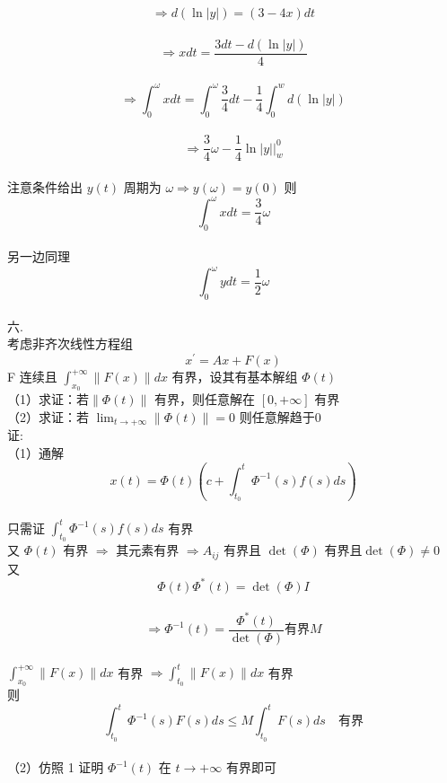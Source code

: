\documentclass[UTF8]{ctexart}
\begin{document}
$$\Rightarrow d(\ln |y|)=(3-4 x) d t$$\\
$$\Rightarrow x d t=\frac{3 d t-d(\ln |y|)}{4}$$\\
$$\Rightarrow \int_{0}^{\omega} x d t=\int_{0}^{\omega} \frac{3}{4} d t-\frac{1}{4} \int_{0}^{w} d(\ln |y|)$$\\
$$\Rightarrow \frac{3}{4} \omega - \frac{1}{4} \ln |y| \Big|_{w}^{0}$$\\
注意条件给出 $y(t)$ 周期为 $\omega \Rightarrow y(\omega)=y(0)$ 则 $$\int_{0}^{\omega} x d t=\frac{3}{4} \omega$$\\
另一边同理 $$\int_{0}^{\omega} y d t=\frac{1}{2} \omega$$\\
六.\\
考虑非齐次线性方程组
$$
x^{\prime}=A x+F(x)
$$
F 连续且 $\int_{x_{0}}^{+\infty}\|F(x)\| d x$ 有界，设其有基本解组 $\Phi(t)$\\
（1）求证：若$\|\Phi(t) \|$ 有界，则任意解在 $[0,+\infty]$ 有界\\
（2）求证：若 $\lim _{t \rightarrow+\infty}\|\Phi(t)\|=0$ 则任意解趋于$0$\\
证:\\（1）通解 $$x(t)=\Phi(t)\left(c+\int_{t_{0}}^{t} \Phi^{-1}(s) f(s) d s\right)$$\\
只需证 $\int_{t_{0}}^{t} \Phi^{-1}(s) f(s) d s$ 有界\\
又 $\Phi(t)$ 有界 $\Rightarrow$ 其元素有界 $\Rightarrow A_{i j}$ 有界且 $\operatorname{det}(\Phi)$ 有界且$\operatorname{det}(\Phi) \neq 0$\\
又 $$\Phi(t) \Phi^{*}(t)=\operatorname{det}(\Phi) I$$\\
$$\Rightarrow \Phi^{-1}(t)=\frac{\Phi^{*}(t)}{\operatorname{det}(\Phi)} \text{有界} M$$\\
$\int_{x_{0}}^{+\infty}\|F(x)\| d x$ 有界 $\Rightarrow \int_{t_{0}}^{t}\|F(x)\| d x$ 有界\\
则
 $$\int_{t_{0}}^{t} \Phi^{-1}(s) F(s) d s \leq M \int_{t_{0}}^{t} F(s) d s \quad \text{有界}$$\\
（2）仿照 1 证明 $\Phi^{-1}(t)$ 在 $t \rightarrow+\infty$ 有界即可
\end{document}
